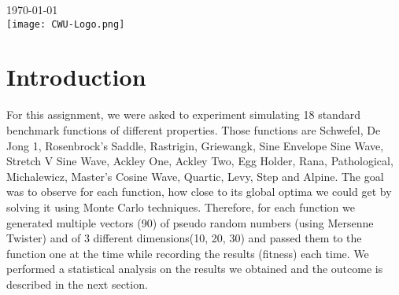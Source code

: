 \documentclass[12pt]{article}
\begin{document}
\begin{titlepage}
		
		
		{\large \today}\\ %
		
		
		\texttt{[image: CWU-Logo.png]}\\[.5cm] %
		
		
		\vfill %
		
	\end{titlepage}
	\newpage
	\tableofcontents
	\newpage
	
	
	
	\section{Introduction}
	For this assignment, we were asked to experiment simulating 18 standard benchmark functions of different properties. Those functions are Schwefel, De Jong 1, Rosenbrock's Saddle, Rastrigin, Griewangk, Sine Envelope Sine Wave, Stretch V Sine Wave, Ackley One, Ackley Two, Egg Holder, Rana, Pathological, Michalewicz, Master's Cosine Wave, Quartic, Levy, Step and Alpine. The goal was to observe for each function, how close to its global optima we could get by solving it using Monte Carlo techniques. Therefore, for each function we generated multiple vectors (90) of pseudo random numbers (using Mersenne Twister) and of 3 different dimensions(10, 20, 30) and passed them to the function one at the time while recording the results (fitness) each time. We performed a statistical analysis on the results we obtained and the outcome is described in the next section.
	
\end{document}
